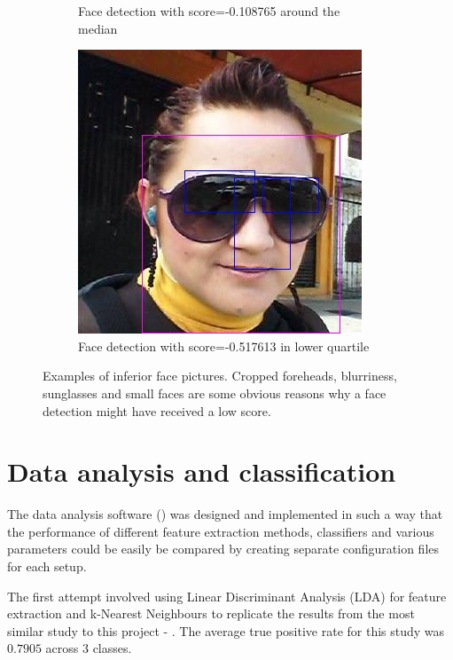 \begin{figure}
\begin{subfigure}[t]{0.3\textwidth}
      \caption{Face detection with score=-0.108765 around the median}
      \label{fig:results:fd:median_detected1}
    \end{subfigure}
    \begin{subfigure}[t]{0.3\textwidth}
      \includegraphics[width=\textwidth]{figures/results/detected_q1_f1c5f486-1697-4089-9bb6-7962d7db630c}
      \caption{Face detection with score=-0.517613 in lower quartile}
      \label{fig:results:fd:q1_detected3}
    \end{subfigure}
\caption{Examples of inferior face pictures. Cropped foreheads, blurriness,
sunglasses and small faces are some obvious reasons why a face detection might
have received a low score.}
\label{fig:results:fd:other_detected}
\end{figure}


\section{Data analysis and classification}
The data analysis software () was designed and
implemented in such a way that the performance of different feature extraction
methods, classifiers and various parameters could be easily be compared by
creating separate configuration files for each setup.

The first attempt involved using Linear Discriminant Analysis (LDA) for feature
extraction and k-Nearest Neighbours to replicate the results from the most
similar study to this project - \citep{chinesegroups}. The average true
positive rate for this study was $0.7905$ across 3 classes.

